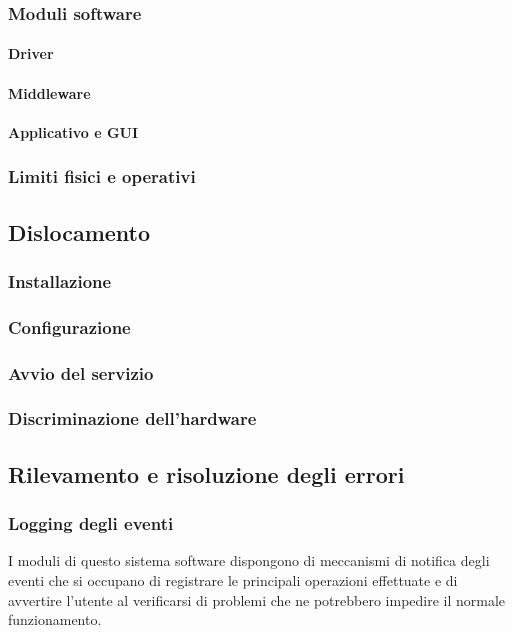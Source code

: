 \subsubsection{Moduli software}
\paragraph{Driver}
\paragraph{Middleware}
\paragraph{Applicativo e GUI}
\subsubsection{Limiti fisici e operativi}

\subsection{Dislocamento}
\subsubsection{Installazione}
\subsubsection{Configurazione}
\subsubsection{Avvio del servizio}
\subsubsection{Discriminazione dell'hardware}

\newpage
\subsection{Rilevamento e risoluzione degli errori}
\subsubsection{Logging degli eventi}
I moduli di questo sistema software dispongono di meccanismi di notifica degli
eventi che si occupano di registrare le principali operazioni effettuate e di
avvertire l'utente al verificarsi di problemi che ne potrebbero impedire il
normale funzionamento.

